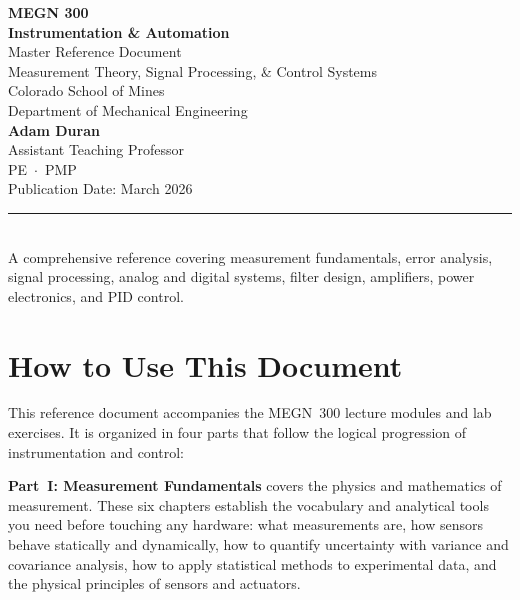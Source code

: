 \documentclass[11pt,letterpaper,twoside,openany]{book}
\begin{document}
\begin{titlepage}
\begin{center}
\vspace*{2cm}
{\Huge\bfseries\sffamily\textcolor{MinesBlue}{MEGN 300}}\\[0.5cm]
{\Huge\bfseries\sffamily\textcolor{MinesBlue}{Instrumentation \& Automation}}\\[2cm]
{\huge\sffamily\textcolor{MinesBlue}{Master Reference Document}}\\[1cm]
{\Large\sffamily Measurement Theory, Signal Processing, \& Control Systems}\\[3cm]
{\large\sffamily\textcolor{MinesSilver}{Colorado School of Mines}}\\[0.3cm]
{\large\sffamily\textcolor{MinesSilver}{Department of Mechanical Engineering}}\\[1.5cm]
{\Large\sffamily\textbf{Adam Duran}}\\[0.2cm]
{\normalsize\sffamily Assistant Teaching Professor}\\[0.2cm]
{\normalsize\sffamily\textcolor{MinesSilver}{PE \,$\cdot$\, PMP}}\\[1.5cm]
{\normalsize\sffamily\textcolor{MinesSilver}{Publication Date: March 2026}}\\[0.8cm]
\textcolor{MinesBlue}{\rule{0.6\textwidth}{1pt}}\\[0.5cm]
{\normalsize\sffamily A comprehensive reference covering measurement fundamentals, error analysis, signal processing, analog and digital systems, filter design, amplifiers, power electronics, and PID control.}
\end{center}
\end{titlepage}

\frontmatter
\tableofcontents
\newpage

\chapter*{How to Use This Document}

This reference document accompanies the MEGN~300 lecture modules and lab exercises. It is organized in four parts that follow the logical progression of instrumentation and control:

\textbf{Part~I: Measurement Fundamentals} covers the physics and mathematics of measurement. These six chapters establish the vocabulary and analytical tools you need before touching any hardware: what measurements are, how sensors behave statically and dynamically, how to quantify uncertainty with variance and covariance analysis, how to apply statistical methods to experimental data, and the physical principles of sensors and actuators.
\end{document}
